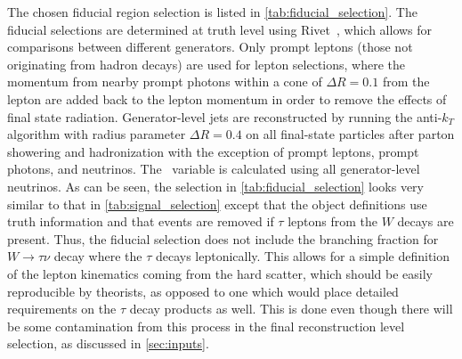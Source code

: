 The chosen fiducial region selection 
is listed in \tab\ref{tab:fiducial_selection}.
The fiducial selections are determined at truth level 
using Rivet~\cite{Buckley:2010ar}, which allows for 
comparisons between different generators.
Only prompt leptons (those not originating from hadron decays) are used for 
lepton selections, where the momentum from nearby prompt photons 
within a cone of $\Delta R = 0.1$ from the lepton are added
back to the lepton momentum in order to remove the effects of final 
state radiation. Generator-level jets are 
reconstructed by running the anti-$k_T$ algorithm with radius 
parameter $\Delta R = 0.4$ on all final-state particles 
after parton showering and hadronization with the exception of prompt 
leptons, prompt photons, and neutrinos. The \MET~variable is calculated 
using all generator-level neutrinos. 
As can be seen, the selection 
in \tab\ref{tab:fiducial_selection} looks very similar to that in 
\tab\ref{tab:signal_selection} except that the object definitions
use truth information and that 
events are removed if $\tau$ leptons from the $W$ decays are present.
Thus, the fiducial selection
does not include the branching fraction for $W\rightarrow\tau\nu$ decay 
where the $\tau$ decays leptonically. This allows for a simple definition
of the lepton kinematics coming from the hard scatter, 
which should be easily reproducible by theorists,
as opposed to one which would place detailed requirements on the $\tau$ decay
products as well.
This is done even though there will be some contamination from this process in the final 
reconstruction level selection, as discussed in \sec\ref{sec:inputs}.



